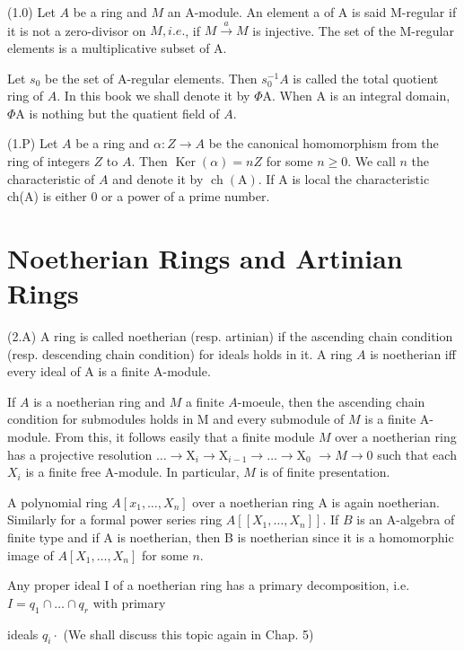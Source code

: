 (1.0) Let $A$ be a ring and $M$ an A-module. An element a of A is said M-regular if it is not a zero-divisor on $M, i . e .$, if $M \stackrel{a}{\rightarrow} M$ is injective. The set of the M-regular elements is a multiplicative subset of A.

Let $s_{0}$ be the set of A-regular elements. Then $s_{0}^{-1} A$ is called the total quotient ring of $A$. In this book we shall denote it by $\Phi \mathrm{A}$. When $\mathrm{A}$ is an integral domain, $\Phi \mathrm{A}$ is nothing but the quatient field of $A$.

(1.P) Let $A$ be a ring and $\alpha: Z \rightarrow A$ be the canonical homomorphism from the ring of integers $Z$ to $A$. Then $\operatorname{Ker}(\alpha)=n Z$ for some $n \geqslant 0$. We call $n$ the characteristic of $A$ and denote it by $\operatorname{ch}(\mathrm{A})$. If $\mathrm{A}$ is local the characteristic ch(A) is either 0 or a power of a prime number.

\section{Noetherian Rings and Artinian Rings}
(2.A) A ring is called noetherian (resp. artinian) if the ascending chain condition (resp. descending chain condition) for ideals holds in it. A ring $A$ is noetherian iff every ideal of A is a finite A-module.

If $A$ is a noetherian ring and $M$ a finite $A$-moeule, then the ascending chain condition for submodules holds in M and every submodule of $M$ is a finite A-module. From this, it follows easily that a finite module $M$ over a noetherian ring has a projective resolution $\ldots \rightarrow \mathrm{X}_{i} \rightarrow \mathrm{X}_{i-1} \rightarrow \ldots \rightarrow \mathrm{X}_{0}$ $\rightarrow M \rightarrow 0$ such that each $X_{i}$ is a finite free A-module. In particular, $M$ is of finite presentation.

A polynomial ring $A\left[x_{1}, \ldots, X_{n}\right]$ over a noetherian ring A is again noetherian. Similarly for a formal power series ring $A\left[\left[X_{1}, \ldots, X_{n}\right]\right]$. If $B$ is an A-algebra of finite type and if A is noetherian, then B is noetherian since it is a homomorphic image of $A\left[X_{1}, \ldots, X_{n}\right]$ for some $n$.

Any proper ideal I of a noetherian ring has a primary decomposition, i.e. $I=q_{1} \cap \ldots \cap q_{r}$ with primary

ideals $q_{i} \cdot$ (We shall discuss this topic again in Chap. 5)

